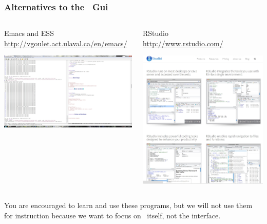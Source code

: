 \documentclass[color=usenames,dvipsnames]{beamer}\usepackage[]{graphicx}\usepackage[]{color}
\begin{document}
\begin{frame}
  \frametitle{Alternatives to the \R~Gui}
  \begin{columns}
    \small
    \begin{column}{0.6\textwidth}
      \centering
      Emacs and ESS \\ \tiny
      \url{http://vgoulet.act.ulaval.ca/en/emacs/} \par
      \includegraphics[width=\textwidth]{figs/emacs}
    \end{column}
    \begin{column}{0.4\textwidth}
      \centering
      RStudio \\
      \url{http://www.rstudio.com/} \par
      \includegraphics[width=\textwidth]{figs/Rstudio}
    \end{column}
  \end{columns}
  \small
  \vspace{0.5cm}
  You are encouraged to learn and use these programs, but we will not
  use them for instruction because we want to focus on \R~itself, not
  the interface.
\end{frame}
\end{document}
